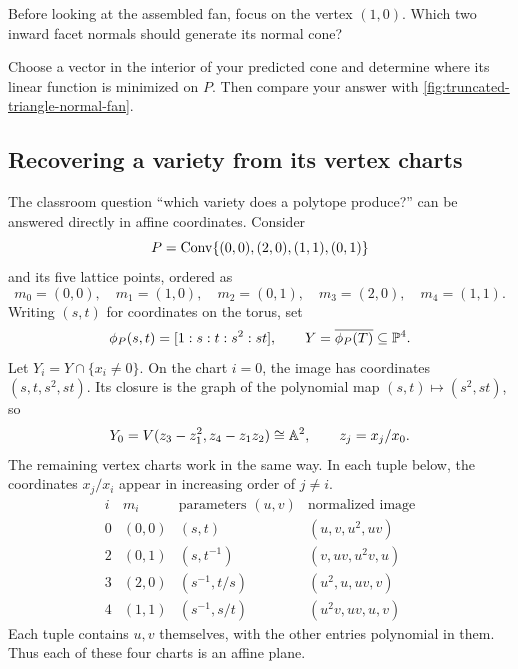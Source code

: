 \begin{prediction}
Before looking at the assembled fan, focus on the vertex \((1,0)\).
Which two inward facet normals should generate its normal cone?

Choose a vector in the interior of your predicted cone and determine
where its linear function is minimized on \(P\). Then compare your
answer with \cref{fig:truncated-triangle-normal-fan}.
\end{prediction}

\subsection{Recovering a variety from its vertex charts}

\begin{example}
\label{ex:classroom-trapezoid-charts}
The classroom question ``which variety does a polytope produce?'' can
be answered directly in affine coordinates. Consider
\[
P=\operatorname{Conv}\{(0,0),(2,0),(1,1),(0,1)\}
\]
and its five lattice points, ordered as
\[
m_0=(0,0),\quad m_1=(1,0),\quad m_2=(0,1),\quad
m_3=(2,0),\quad m_4=(1,1).
\]
Writing \((s,t)\) for coordinates on the torus, set
\[
\phi_P(s,t)=[1:s:t:s^2:st],\qquad
Y=\overline{\phi_P(T)}\subseteq\mathbb{P}^4.
\]
Let \(Y_i=Y\cap\{x_i\ne0\}\). On the chart \(i=0\),
the image has coordinates \((s,t,s^2,st)\). Its closure is the graph
of the polynomial map \((s,t)\mapsto(s^2,st)\), so
\[
Y_0=V(z_3-z_1^2,z_4-z_1z_2)\cong\mathbb{A}^2,
\qquad z_j=x_j/x_0.
\]
The remaining vertex charts work in the same way. In each tuple below,
the coordinates \(x_j/x_i\) appear in increasing order of \(j\ne i\).
\[
\begin{array}{c|c|c|c}
i&m_i&\text{parameters }(u,v)&\text{normalized image}\\ \hline
0&(0,0)&(s,t)&(u,v,u^2,uv)\\
2&(0,1)&(s,t^{-1})&(v,uv,u^2v,u)\\
3&(2,0)&(s^{-1},t/s)&(u^2,u,uv,v)\\
4&(1,1)&(s^{-1},s/t)&(u^2v,uv,u,v)
\end{array}
\]
Each tuple contains \(u,v\) themselves, with the other entries
polynomial in them. Thus each of these four charts is an affine plane.


\end{example}

